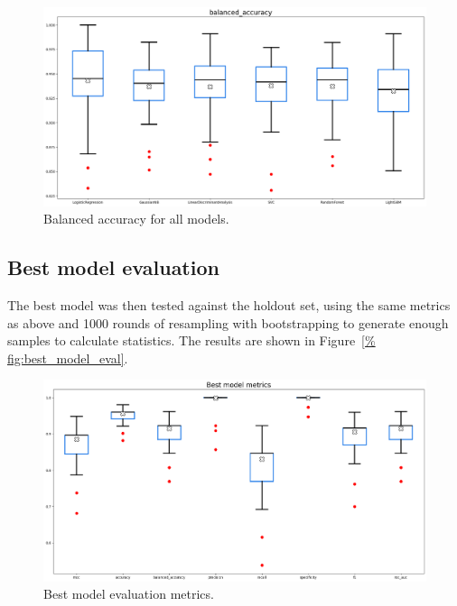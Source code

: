 \documentclass[12pt]{article}
\begin{document}
\begin{figure}[H]
    \centering
    \includegraphics[width=\textwidth]{ims/balanced_accuracy.png}
    \caption{Balanced accuracy for all models.}
    \label{fig:balanced_accuracy}
\end{figure}


\subsection{Best model evaluation}

The best model was then tested against the holdout set, using the same metrics
as above and 1000 rounds of resampling with bootstrapping to generate enough
samples to calculate statistics. The results are shown in Figure~\ref{%
fig:best_model_eval}.

\begin{figure}[H]
    \centering
    \includegraphics[width=\textwidth]{ims/best.png}
    \caption{Best model evaluation metrics.}
    \label{fig:best_model_eval}
\end{figure}
\end{document}
